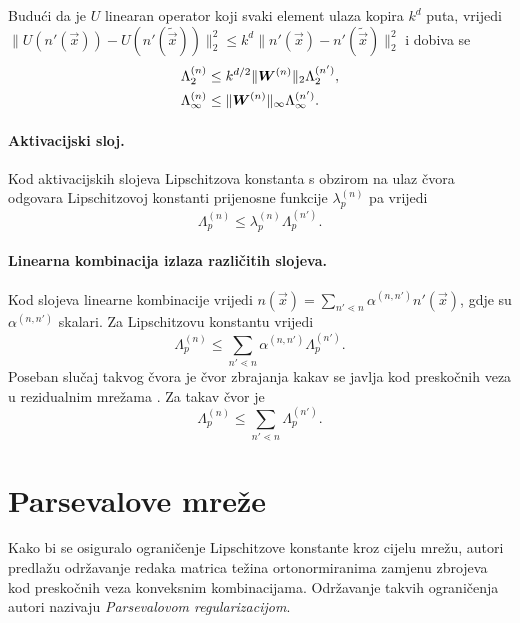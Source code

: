 \documentclass[utf8, seminar, numeric, lmodern]{feri}
\begin{document}
Budući da je $U$ linearan operator koji svaki element ulaza kopira $k^d$ puta, vrijedi $\lVert U(n'(\vec x))-U(n'(\widetilde{\vec x}))\rVert_2^2 \leq k^d\lVert n'(\vec x)-n'(\widetilde{\vec x})\rVert_2^2$ i dobiva se
\begin{align} \label{eq:konv-lipschitz}
\Lambda_2^{(n)} &\leq k^{d/2} \lVert \bm{W}^{(n)}\rVert_2\Lambda_2^{(n')}, \\ \Lambda_\infty^{(n)} &\leq \lVert \bm{W}^{(n)}\rVert_\infty\Lambda_\infty^{(n')}.
\end{align}

\paragraph{Aktivacijski sloj.} Kod aktivacijskih slojeva Lipschitzova konstanta s obzirom na ulaz čvora odgovara Lipschitzovoj konstanti prijenosne funkcije $\lambda_p^{(n)}$ pa vrijedi
\begin{equation}
\Lambda_p^{(n)} \leq \lambda_p^{(n)}\Lambda_p^{(n')}.
\end{equation}

\paragraph{Linearna kombinacija izlaza različitih slojeva.} Kod slojeva linearne kombinacije vrijedi $n(\vec x) = \sum_{n'\lessdot n}\alpha^{(n,n')}n'(\vec x)$, gdje su $\alpha^{(n,n')}$ skalari. Za Lipschitzovu konstantu vrijedi
\begin{equation} \label{eq:linear-combination}
\Lambda_p^{(n)} \leq \sum_{n'\lessdot n}\alpha^{(n,n')}\Lambda_p^{(n')}.
\end{equation}
Poseban slučaj takvog čvora je čvor zbrajanja kakav se javlja kod preskočnih veza u rezidualnim mrežama \cite{he15-resnet}. Za takav čvor je
\begin{equation}
\Lambda_p^{(n)} \leq \sum_{n'\lessdot n}\Lambda_p^{(n')}.
\end{equation}


\section{Parsevalove mreže}

Kako bi se osiguralo ograničenje Lipschitzove konstante kroz cijelu mrežu, autori predlažu održavanje redaka matrica težina ortonormiranima zamjenu zbrojeva kod preskočnih veza konveksnim kombinacijama. Održavanje takvih ograničenja autori nazivaju \emph{Parsevalovom regularizacijom}.
\end{document}
